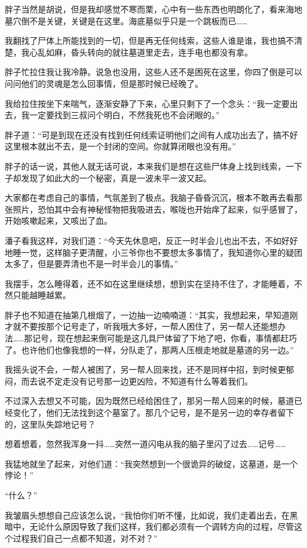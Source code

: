 胖子当然是胡说，但是我却感觉不寒而栗，心中有一些东西也明朗化了，看来海地墓穴倒不是关键，关键是在这里。海底墓似乎只是一个跳板而已……

我翻找了尸体上所能找到的一切，但是再无任何线索，这些人谁是谁，我也搞不清楚，我心乱如麻，昏头转向的就往墓道里走去，连手电也都没有拿。

胖子忙拉住我让我冷静。说急也没用，这些人还不是困死在这里，你四了倒是可以问问他们的灵魂是怎么回事情，但是那时候已经晚了。

我给拉住按坐下来喘气，逐渐安静了下来，心里只剩下了一个念头：“我一定要出去，我一定要找到三叔问个明白，不然我死也不会闭眼的。”

胖子道：“可是到现在还没有找到任何线索证明他们之间有人成功出去了，搞不好这里根本就出不去，是一个封闭的空间。你就算闭眼也没有用。”

胖子的话一说，其他人就无话可说，本来我们是想在这些尸体身上找到线索，一下子却发现了如此大的一个秘密，真是一波未平一波又起。

大家都在考虑自己的事情，气氛差到了极点。我脑子昏昏沉沉，根本不敢再去看那张照片，恐怕其中会有神秘怪物把我吸进去，喉咙也开始痒了起来，似乎感冒了，开始咳嗽起来，又咳出了血。

潘子看我这样，对我们道：“今天先休息吧，反正一时半会儿也出不去，不如好好地睡一觉，这样脑子更清醒，小三爷你也不要想太多事情了，我知道你心里的疑团太多了，但是要弄清也不是一时半会儿的事情。”

我摆手，怎么睡得着，还不如在这里继续想，想到实在坚持不住了，才能睡着，不然只能越睡越累。

胖子也不知道在抽第几根烟了，一边抽一边喃喃道：“其实，我想起来，早知道刚才就不要按那个记号走了，听我哦大多好，一帮人困住了，另一帮人还能想办法……那记号，现在想起来倒可能是这几具尸体留了下地了吧，你看，事情都赶巧了。也许他们也像我想的一样，分队走了，那两人压根走地就是墓道的另一边。”

我摇头说不会，一帮人被困了，另一帮人回来找，还不是同样中招，到时候更郁闷，而去说不定走没有记号那一边更凶险，不知道有什么等着我们。

不过深入去想又不可能，因为既然已经给困住了，那另一帮人回来的时候，墓道已经变化了，他们无法找到这个墓室了。那几个记号，是不是另一边的幸存者留下的，这里队失踪地记号？

想着想着，忽然我浑身一抖……突然一道闪电从我的脑子里闪了过去……记号……

我猛地就坐了起来，对他们道：“我突然想到一个很诡异的破绽，这墓道，是一个悖论！”

“什么？”

我皱眉头想想自己应该怎么说，“我怕你们听不懂，比如说，我们走着出去，在黑暗中，无论什么原因导致了我们这样，我们都必须有一个调转方向的过程，尽管这个过程我们自己一点都不知道，对不对？”

